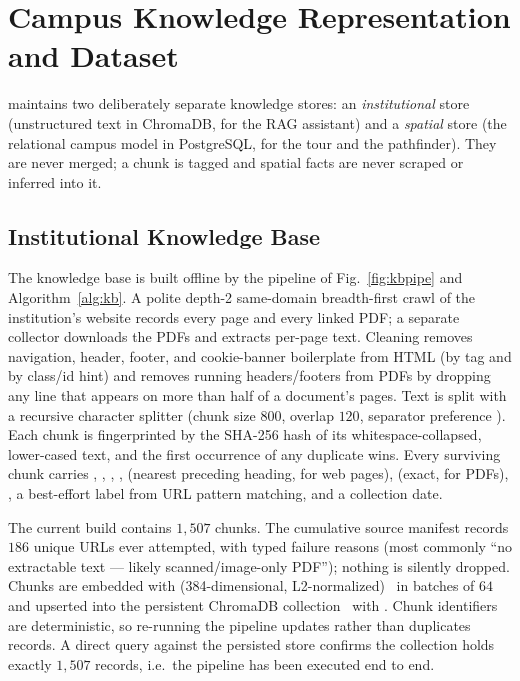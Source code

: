 \section{Campus Knowledge Representation and Dataset}
\label{sec:dataset}




\system{} maintains two deliberately separate knowledge stores: an
\emph{institutional} store (unstructured text in ChromaDB, for the RAG
assistant) and a \emph{spatial} store (the relational campus model in
PostgreSQL, for the tour and the pathfinder). They are never merged; a
chunk is tagged  and
spatial facts are never scraped or inferred into it.

\subsection{Institutional Knowledge Base}
The knowledge base is built offline by the pipeline of
Fig.~\ref{fig:kbpipe} and Algorithm~\ref{alg:kb}. A polite depth-2
same-domain breadth-first crawl of the institution's website records every
page and every linked PDF; a separate collector downloads the PDFs and
extracts per-page text. Cleaning removes navigation, header, footer, and
cookie-banner boilerplate from HTML (by tag and by class/id hint) and
removes running headers/footers from PDFs by dropping any line that appears
on more than half of a document's pages. Text is split with a recursive
character splitter (chunk size $800$, overlap $120$, separator preference
).
Each chunk is fingerprinted by the SHA-256 hash of its whitespace-collapsed,
lower-cased text, and the first occurrence of any duplicate wins. Every
surviving chunk carries , ,
, ,  (nearest preceding
heading, for web pages),  (exact, for PDFs), ,
a best-effort  label from URL pattern matching, and a
collection date.

The current build contains $1{,}507$ chunks. The cumulative source manifest
records $186$ unique URLs ever attempted, with typed failure reasons (most
commonly ``no extractable text --- likely scanned/image-only PDF''); nothing
is silently dropped. Chunks are embedded with 
(384-dimensional, L2-normalized)~\cite{sbertlib} in batches of $64$ and
upserted into the persistent ChromaDB collection~\cite{chroma2023}
 with . Chunk identifiers are deterministic, so re-running the pipeline
updates rather than duplicates records. A direct query against the
persisted store confirms the collection holds exactly $1{,}507$ records,
i.e.\ the pipeline has been executed end to end.

